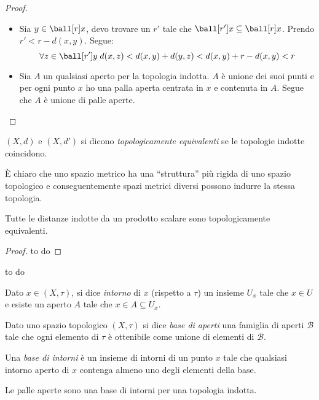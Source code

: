 \begin{proof}\noindent
\begin{itemize}
\item Sia $y \in \ball[r]x$, devo trovare un $r'$ tale che $\ball[r']x \subseteq \ball[r]x$. Prendo $r' < r-d(x,y)$. Segue:
\[\forall z \in \ball[r']y\; d(x,z) < d(x,y) + d(y,z) < d(x,y)  + r - d(x,y) < r\]
\item Sia $A$ un qualsiasi aperto per la topologia indotta. $A$ è unione dei suoi punti e per ogni punto $x$ ho una palla aperta centrata in $x$ e contenuta in $A$. Segue che $A$ è unione di palle aperte.
\end{itemize}
\end{proof}

\begin{defn}
$(X,d)$ e $(X,d')$ si dicono \emph{topologicamente equivalenti} se le topologie indotte coincidono.
\end{defn}

\begin{oss}
È chiaro che uno spazio metrico ha una ``struttura'' più rigida di uno spazio topologico e conseguentemente spazi metrici diversi possono indurre la stessa topologia.
\end{oss}

\begin{teo}
Tutte le distanze indotte da un prodotto scalare sono topologicamente equivalenti.
\end{teo}

\begin{proof}
to do
\end{proof}

\begin{es}
to do
\end{es}

\begin{defn}[Intorno]
Dato $x \in (X,\tau)$, si dice \emph{intorno} di $x$ (rispetto a $\tau$) un insieme $U_x$ tale che $x \in U$  e esiste un aperto $A$ tale che $x \in A \subseteq U_x$.
\end{defn}

\begin{defn}
Dato uno spazio topologico $(X,\tau)$ si dice \emph{base di aperti} una famiglia di aperti $\mathcal B$ tale che ogni elemento di $\tau$ è ottenibile come unione di elementi di $\mathcal B$.
\end{defn}

\begin{defn}
Una \emph{base di intorni} è un insieme di intorni di un punto $x$ tale che qualsiasi intorno aperto di $x$ contenga almeno uno degli elementi della base.
\end{defn}

\begin{oss}
Le palle aperte sono una base di intorni per una topologia indotta.
\end{oss}